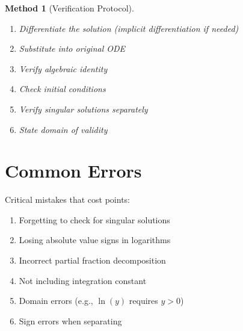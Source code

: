\documentclass[12pt]{article}
\newtheorem{method}{Method}
\begin{document}
\begin{method}[Verification Protocol]
\begin{enumerate}
    \item Differentiate the solution (implicit differentiation if needed)
    \item Substitute into original ODE
    \item Verify algebraic identity
    \item Check initial conditions
    \item Verify singular solutions separately
    \item State domain of validity
\end{enumerate}
\end{method}

\section{Common Errors}

\begin{warning}
Critical mistakes that cost points:
\begin{enumerate}
    \item Forgetting to check for singular solutions
    \item Losing absolute value signs in logarithms
    \item Incorrect partial fraction decomposition
    \item Not including integration constant
    \item Domain errors (e.g., $\ln(y)$ requires $y > 0$)
    \item Sign errors when separating
\end{enumerate}
\end{warning}
\end{document}
